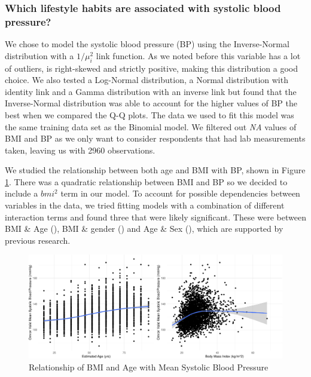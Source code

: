 \documentclass[
  11pt,
  twocolumn]{article}
\begin{document}
\subsubsection{Which lifestyle habits are associated with systolic blood
pressure?}\label{which-lifestyle-habits-are-associated-with-systolic-blood-pressure}

We chose to model the systolic blood pressure (BP) using the
Inverse-Normal distribution with a \(1/\mu_i^2\) link function. As we
noted before this variable has a lot of outliers, is right-skewed and
strictly positive, making this distribution a good choice. We also
tested a Log-Normal distribution, a Normal distribution with identity
link and a Gamma distribution with an inverse link but found that the
Inverse-Normal distribution was able to account for the higher values of
BP the best when we compared the Q-Q plots. The data we used to fit this
model was the same training data set as the Binomial model. We filtered
out \emph{NA} values of BMI and BP as we only want to consider
respondents that had lab measurements taken, leaving us with 2960
observations.

We studied the relationship between both age and BMI with BP, shown in
Figure \ref{fig:output-relationship-plots}. There was a quadratic
relationship between BMI and BP so we decided to include a \(bmi^2\)
term in our model. To account for possible dependencies between
variables in the data, we tried fitting models with a combination of
different interaction terms and found three that were likely
significant. These were between BMI \& Age
(), BMI \& gender
() and Age \& Sex
(), which are supported by previous
research.

\begin{figure}[H]
\includegraphics{Coursework_files/figure-latex/output-relationship-plots-1} \caption{Relationship of BMI and Age with Mean Systolic Blood Pressure}\label{fig:output-relationship-plots}
\end{figure}
\end{document}
